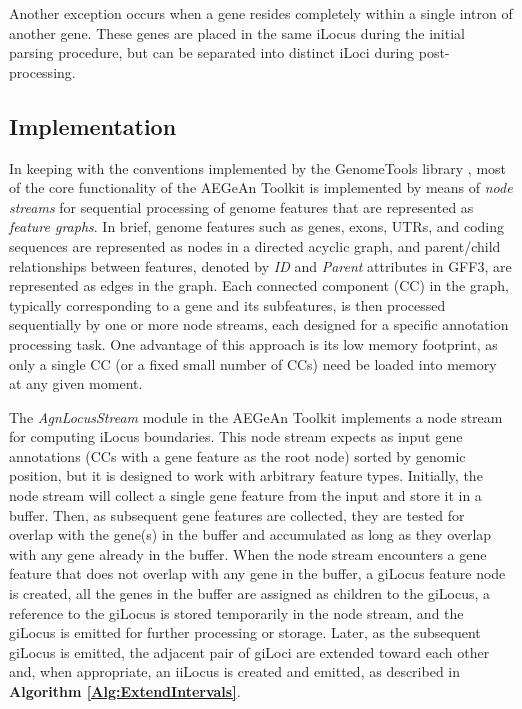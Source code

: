 Another exception occurs when a gene resides completely within a single intron of another gene.
These genes are placed in the same iLocus during the initial parsing procedure, but can be separated into distinct iLoci during post-processing.

\subsection*{Implementation}
In keeping with the conventions implemented by the GenomeTools library \cite{GenomeTools}, most of the core functionality of the AEGeAn Toolkit is implemented by means of \textit{node streams} for sequential processing of genome features that are represented as \textit{feature graphs}.
In brief, genome features such as genes, exons, UTRs, and coding sequences are represented as nodes in a directed acyclic graph, and parent/child relationships between features, denoted by \textit{ID} and \textit{Parent} attributes in GFF3, are represented as edges in the graph.
Each connected component (CC) in the graph, typically corresponding to a gene and its subfeatures, is then processed sequentially by one or more node streams, each designed for a specific annotation processing task.
One advantage of this approach is its low memory footprint, as only a single CC (or a fixed small number of CCs) need be loaded into memory at any given moment.

The \textit{AgnLocusStream} module in the AEGeAn Toolkit implements a node stream for computing iLocus boundaries.
This node stream expects as input gene annotations (CCs with a gene feature as the root node) sorted by genomic position, but it is designed to work with arbitrary feature types.
Initially, the node stream will collect a single gene feature from the input and store it in a buffer.
Then, as subsequent gene features are collected, they are tested for overlap with the gene(s) in the buffer and accumulated as long as they overlap with any gene already in the buffer.
When the node stream encounters a gene feature that does not overlap with any gene in the buffer, a giLocus feature node is created, all the genes in the buffer are assigned as children to the giLocus, a reference to the giLocus is stored temporarily in the node stream, and the giLocus is emitted for further processing or storage.
Later, as the subsequent giLocus is emitted, the adjacent pair of giLoci are extended toward each other and, when appropriate, an iiLocus is created and emitted, as described in \textbf{Algorithm \ref{Alg:ExtendIntervals}}.

